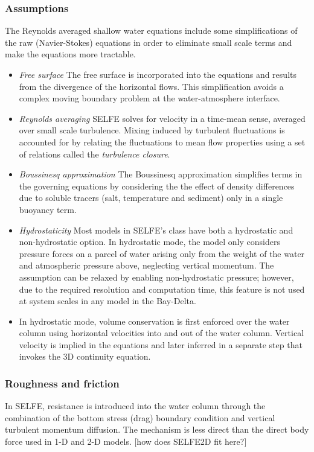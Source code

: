 \subsubsection{Assumptions}\label{sec-assump}
The Reynolds averaged shallow water equations include some simplifications of the raw (Navier-Stokes) equations in order
to eliminate small scale terms and make the equations more tractable.
\begin{itemize}
\item {\em Free surface} The free surface is incorporated into the equations and results from the 
divergence of the horizontal flows. This simplification avoids a complex moving boundary problem at the water-atmosphere interface.
\item {\em Reynolds averaging} SELFE solves for velocity in a time-mean sense, averaged over small scale turbulence. Mixing induced by turbulent fluctuations 
is accounted for by relating the fluctuations to mean flow properties using a set of relations called the {\em turbulence closure}. 
\item {\em Boussinesq approximation} The Boussinesq approximation simplifies terms in the governing equations by considering the the effect of density differences due to soluble tracers (salt, temperature and sediment) only
in a single buoyancy term.
\item {\em Hydrostaticity} Most models in SELFE's class have both a hydrostatic and non-hydrostatic option. In hydrostatic mode, the model only considers pressure forces on a parcel of water arising only from the weight of the water and atmospheric pressure above, neglecting vertical momentum. 
The assumption can be relaxed by enabling non-hydrostatic pressure; however, due to the required resolution and computation time, 
this feature is not used at system scales in any model in the Bay-Delta.
\item In hydrostatic mode, volume conservation is first enforced over the water column using horizontal velocities into and out of the water column. Vertical velocity is implied in the equations and later inferred in a separate step that invokes the 3D continuity equation. 
\end{itemize}

\subsubsection{Roughness and friction}
In SELFE, resistance is introduced into the water column through the combination of the bottom stress (drag)
boundary condition and vertical turbulent momentum diffusion. The mechanism is less direct than the direct 
body force used in 1-D and 2-D models. [how does SELFE2D fit here?]

